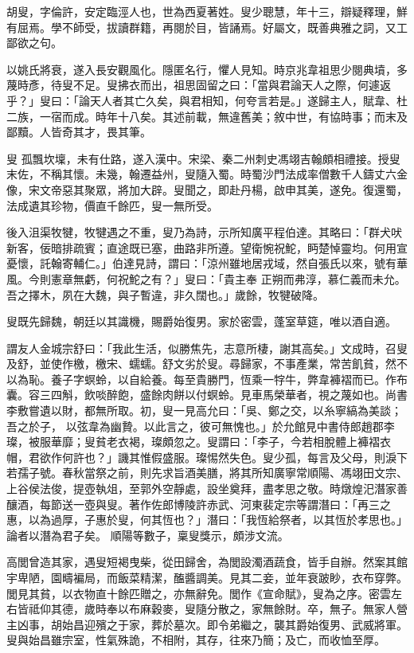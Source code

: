 \begin{pinyinscope}
 胡叟，字倫許，安定臨涇人也，世為西夏著姓。叟少聰慧，年十三，辯疑釋理，鮮有屈焉。學不師受，拔讀群籍，再閱於目，皆誦焉。好屬文，既善典雅之詞，又工鄙欲之句。



 以姚氏將衰，遂入長安觀風化。隱匿名行，懼人見知。時京兆韋祖思少閱典墳，多蔑時彥，待叟不足。叟拂衣而出，祖思固留之曰：「當與君論天人之際，何遽返乎？」叟曰：「論天人者其亡久矣，與君相知，何夸言若是。」遂歸主人，賦韋、杜二族，一宿而成。時年十八矣。其述前載，無違舊美；敘中世，有協時事；而末及鄙黷。人皆奇其才，畏其筆。



 叟
 孤飄坎壈，未有仕路，遂入漢中。宋梁、秦二州刺史馮翊吉翰頗相禮接。授叟末佐，不稱其懷。未幾，翰遷益州，叟隨入蜀。時蜀沙門法成率僧數千人鑄丈六金像，宋文帝惡其聚眾，將加大辟。叟聞之，即赴丹楊，啟申其美，遂免。復還蜀，法成遺其珍物，價直千餘匹，叟一無所受。



 後入沮渠牧犍，牧犍遇之不重，叟乃為詩，示所知廣平程伯達。其略曰：「群犬吠新客，佞暗排疏賓；直途既已塞，曲路非所遵。望衛惋祝鮀，眄楚悼靈均。何用宣憂懷，託翰寄輔仁。」伯達見詩，謂曰：「涼州雖地居戎域，然自張氏以來，號有華風。今則憲章無虧，何祝鮀之有？」叟曰：「貴主奉
 正朔而弗淳，慕仁義而未允。吾之擇木，夙在大魏，與子暫違，非久闊也。」歲餘，牧犍破降。



 叟既先歸魏，朝廷以其識機，賜爵始復男。家於密雲，蓬室草筵，唯以酒自適。



 謂友人金城宗舒曰：「我此生活，似勝焦先，志意所棲，謝其高矣。」文成時，召叟及舒，並使作檄，檄宋、蠕蠕。舒文劣於叟。尋歸家，不事產業，常苦飢貧，然不以為恥。養子字螟蛉，以自給養。每至貴勝門，恆乘一牸牛，弊韋褲褶而已。作布囊。容三四斛，飲啖醉飽，盛餘肉餅以付螟蛉。見車馬榮華者，視之蔑如也。尚書李敷嘗遺以財，都無所取。初，叟一見高允曰：「吳、鄭之交，以糸寧縞為美談；吾之於子，
 以弦韋為幽贄。以此言之，彼可無愧也。」於允館見中書侍郎趙郡李璨，被服華靡；叟貧老衣褐，璨頗忽之。叟謂曰：「李子，今若相脫體上褲褶衣帽，君欲作何許也？」譏其惟假盛服。璨惕然失色。叟少孤，每言及父母，則淚下若孺子號。春秋當祭之前，則先求旨酒美膳，將其所知廣寧常順陽、馮翊田文宗、上谷侯法俊，提壺執俎，至郭外空靜處，設坐奠拜，盡孝思之敬。時燉煌汜潛家善釀酒，每節送一壺與叟。著作佐郎博陵許赤武、河東裴定宗等謂潛曰：「再三之惠，以為過厚，子惠於叟，何其恆也？」潛曰：「我恆給祭者，以其恆於孝思也。」論者以潛為君子矣。
 順陽等數子，稟叟獎示，頗涉文流。



 高閭曾造其家，遇叟短褐曳柴，從田歸舍，為閭設濁酒蔬食，皆手自辦。然案其館宇卑陋，園疇褊局，而飯菜精潔，醢醬調美。見其二妾，並年衰跛眇，衣布穿弊。閭見其貧，以衣物直十餘匹贈之，亦無辭免。閭作《宣命賦》，叟為之序。密雲左右皆祗仰其德，歲時奉以布麻穀麥，叟隨分散之，家無餘財。卒，無子。無家人營主凶事，胡始昌迎殯之于家，葬於墓次。即令弟繼之，襲其爵始復男、武威將軍。叟與始昌雖宗室，性氣殊詭，不相附，其存，往來乃簡；及亡，而收恤至厚。




\end{pinyinscope}
